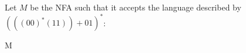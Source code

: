 Let $M$ be the NFA such that it accepts the language described by $(((00)^*(11)) + 01)^*$:
\begin{automata}{M}
	
	
\end{automata}